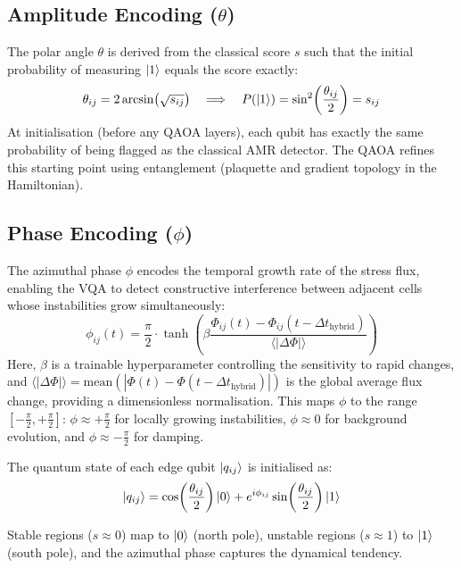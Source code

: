 \documentclass[12pt, a4paper, oneside]{report}
\begin{document}
\subsection{Amplitude Encoding ($\theta$)}

The polar angle $\theta$ is derived from the classical score $s$ such that the initial probability of measuring $\ket{1}$ equals the score exactly:
\begin{equation}
    \theta_{ij} = 2 \arcsin\!\left(\sqrt{s_{ij}}\right) \quad \Longrightarrow \quad P(\ket{1}) = \sin^2\!\left(\frac{\theta_{ij}}{2}\right) = s_{ij}
    \label{eq:theta-encoding}
\end{equation}
At initialisation (before any QAOA layers), each qubit has exactly the same probability of being flagged as the classical AMR detector. The QAOA refines this starting point using entanglement (plaquette and gradient topology in the Hamiltonian).

\subsection{Phase Encoding ($\phi$)}

The azimuthal phase $\phi$ encodes the temporal growth rate of the stress flux, enabling the VQA to detect constructive interference between adjacent cells whose instabilities grow simultaneously:
\begin{equation}
    \phi_{ij}(t) = \frac{\pi}{2} \cdot \tanh\!\left( \beta \frac{\Phi_{ij}(t) - \Phi_{ij}(t - \Delta t_{\text{hybrid}})}{\langle|\Delta\Phi|\rangle} \right)
    \label{eq:phi-encoding}
\end{equation}
Here, $\beta$ is a trainable hyperparameter controlling the sensitivity to rapid changes, and $\langle|\Delta\Phi|\rangle = \text{mean}(|\Phi(t) - \Phi(t-\Delta t_{\text{hybrid}})|)$ is the global average flux change, providing a dimensionless normalisation. This maps $\phi$ to the range $[-\frac{\pi}{2}, +\frac{\pi}{2}]$: $\phi \approx +\frac{\pi}{2}$ for locally growing instabilities, $\phi \approx 0$ for background evolution, and $\phi \approx -\frac{\pi}{2}$ for damping.

The quantum state of each edge qubit $\ket{q_{ij}}$ is initialised as:
\begin{equation}
    \ket{q_{ij}} = \cos\!\left(\frac{\theta_{ij}}{2}\right)\ket{0} + e^{i\phi_{ij}}\sin\!\left(\frac{\theta_{ij}}{2}\right)\ket{1}
\label{eq_init}
\end{equation}

Stable regions ($s \approx 0$) map to $\ket{0}$ (north pole), unstable regions ($s \approx 1$) to $\ket{1}$ (south pole), and the azimuthal phase captures the dynamical tendency.
\end{document}
